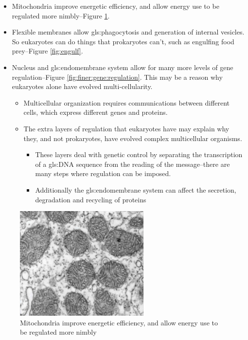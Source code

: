 \documentclass[]{article}
\begin{document}
\begin{itemize}
	\item Mitochondria improve energetic efficiency, and allow energy use to be regulated more nimbly--Figure \ref{fig:EukaryotesMoreEfficient}.
	
	\item Flexible membranes allow \gls{gls:phagocytosis} and generation of internal vesicles. So eukaryotes can do things that prokaryotes can't, such as engulfing food prey--Figure \ref{fig:engulf}.
	
	\item Nucleus and \gls{gls:endomembrane} system allow for many more levels of gene
	regulation--Figure \ref{fig:finer:gene:regulation}. This may be a reason why eukaryotes alone have evolved multi-cellularity.
	\begin{itemize}
		\item Multicellular organization requires communications between different cells, which express different genes and proteins.
		\item The extra layers of regulation that eukaryotes have may explain why they, and not prokaryotes, have evolved complex multicellular organisms. 
		\begin{itemize}
			\item These layers deal with genetic control by separating the transcription of a \gls{gls:DNA} sequence from the reading of the message--there are many steps where regulation can be imposed. 
			\item Additionally the \gls{gls:endomembrane} system can affect the secretion, degradation and recycling of proteins
		\end{itemize}
	\end{itemize}
\end{itemize}

\begin{figure}[H]
	\begin{center}
		\caption[Mitochondria improve energetic efficiency]{Mitochondria improve energetic efficiency, and allow energy use to be regulated more nimbly\cite{lane2010energetics}}\label{fig:EukaryotesMoreEfficient}
		\includegraphics[width=0.6\textwidth]{EukaryotesMoreEfficient}
	\end{center}
\end{figure}
\end{document}
